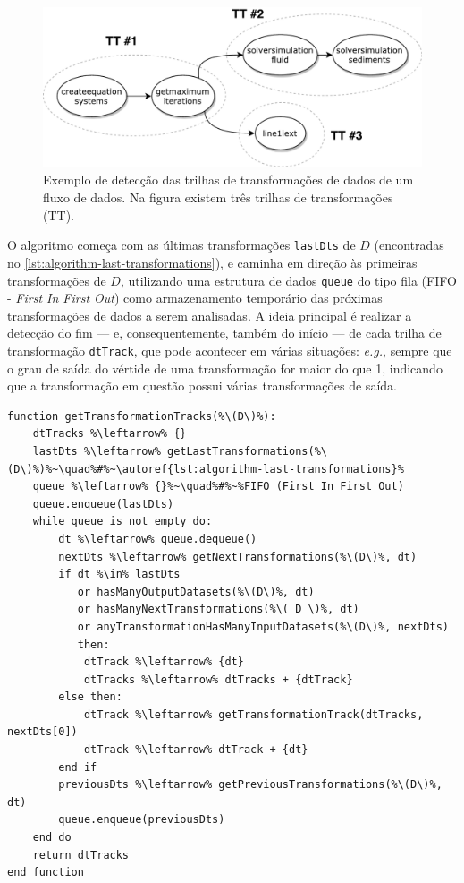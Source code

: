\begin{figure}[htb]
    \centering
    \includegraphics[width=\textwidth]{img/transformation-tracks}
    \caption[Exemplo de detecção das trilhas de transformações.]{Exemplo de detecção das trilhas de transformações de dados de um fluxo de dados. Na figura existem três trilhas de transformações (\textsc{TT}).}%
    \label{fig:transformation-tracks}
\end{figure}

O algoritmo começa com as últimas transformações \texttt{lastDts} de \( D \) (encontradas no \autoref{lst:algorithm-last-transformations}), e caminha em direção às primeiras transformações de \( D \), utilizando uma estrutura de dados \texttt{queue} do tipo fila (FIFO - \textit{First In First Out}) como armazenamento temporário das próximas transformações de dados a serem analisadas. A ideia principal é realizar a detecção do fim --- e, consequentemente, também do início --- de cada trilha de transformação \texttt{dtTrack}, que pode acontecer em várias situações: \textit{e.g.}, sempre que o grau de saída do vértide de uma transformação for maior do que 1, indicando que a transformação em questão possui várias transformações de saída.

\begin{minipage}[c]{0.95\textwidth}
\begin{lstlisting}[language=pseudocode,label={lst:algorithm-transformation-tracks},caption={[Detecção das trilhas de transformações]Detecção do rastro do fluxo de dados no nível de trilhas de transformações.}]
function getTransformationTracks(%\(D\)%):
    dtTracks %\leftarrow% {}
    lastDts %\leftarrow% getLastTransformations(%\(D\)%)%~\quad%#%~\autoref{lst:algorithm-last-transformations}%
    queue %\leftarrow% {}%~\quad%#%~%FIFO (First In First Out)
    queue.enqueue(lastDts)
    while queue is not empty do:
        dt %\leftarrow% queue.dequeue()
        nextDts %\leftarrow% getNextTransformations(%\(D\)%, dt)
        if dt %\in% lastDts
           or hasManyOutputDatasets(%\(D\)%, dt)
           or hasManyNextTransformations(%\( D \)%, dt)
           or anyTransformationHasManyInputDatasets(%\(D\)%, nextDts)
           then:
            dtTrack %\leftarrow% {dt}
            dtTracks %\leftarrow% dtTracks + {dtTrack}
        else then:
            dtTrack %\leftarrow% getTransformationTrack(dtTracks, nextDts[0])
            dtTrack %\leftarrow% dtTrack + {dt}
        end if
        previousDts %\leftarrow% getPreviousTransformations(%\(D\)%, dt)
        queue.enqueue(previousDts)
    end do
    return dtTracks
end function
\end{lstlisting}
\end{minipage}

